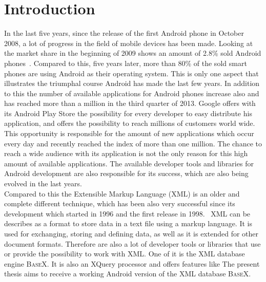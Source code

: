 \chapter{Introduction}
\label{cha:introduction}
In the last five years, since the release of the first Android phone in October 2008, a lot of progress in the field of mobile devices has been made.
Looking at the market share in the beginning of 2009 shows an amount of 2.8\% sold Android phones~\cite{gandhewar2010google}.
Compared to this, five years later, more than 80\% of the sold smart phones are using Android as their operating system.
This is only one aspect that illustrates the triumphal course Android has made the last few years.
In addition to this the number of available applications for Android phones increase also and has reached more than a million in the third quarter of 2013.
Google offers with its Android Play Store the possibility for every developer to easy distribute his application, and offers the possibility to reach millions of customers world wide.
This opportunity is responsible for the amount of new applications which occur every day and recently reached the index of more than one million.
The chance to reach a wide audience with its application is not the only reason for this high amount of available applications.
The available developer tools and libraries for Android development are also responsible for its success, which are also being evolved in the last years.\\
Compared to this the Extensible Markup Language (XML) is an older and complete different technique, which has been also very successful since its development which started in 1996 and the first release in 1998.~\cite{bray1998extensible}
XML can be describes as a format to store data in a text file using a markup language.
It is used for exchanging, storing and defining data, as well as it is extended for other document formats.
Therefore are also a lot of developer tools or libraries that use or provide the possibility to work with XML.
One of it is the XML database engine \textsc{BaseX}.
It is also an XQuery processor and offers features like 
The present thesis aims to receive a working Android version of the XML database \textsc{BaseX}.



